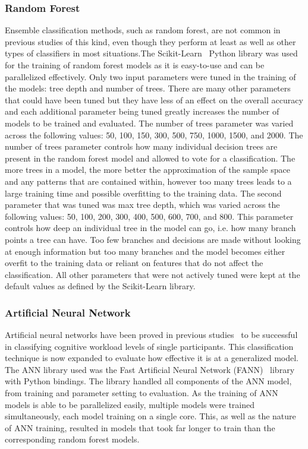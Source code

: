 \documentclass[11pt]{article}
\begin{document}
		\subsubsection{Random Forest}
		Ensemble classification methods, such as random forest, are not common in previous studies of this kind, even though they perform at least as well as other types of classifiers in most situations.The Scikit-Learn~\cite{} Python library was used for the training of random forest models as it is easy-to-use and can be parallelized effectively. Only two input parameters were tuned in the training of the models: tree depth and number of trees. There are many other parameters that could have been tuned but they have less of an effect on the overall accuracy and each additional parameter being tuned greatly increases the number of models to be trained and evaluated. The number of trees parameter was varied across the following values: 50, 100, 150, 300, 500, 750, 1000, 1500, and 2000. The number of trees parameter controls how many individual decision trees are present in the random forest model and allowed to vote for a classification. The more trees in a model, the more better the approximation of the sample space and any patterns that are contained within, however too many trees leads to a large training time and possible overfitting to the training data. The second parameter that was tuned was max tree depth, which was varied across the following values: 50, 100, 200, 300, 400, 500, 600, 700, and 800. This parameter controls how deep an individual tree in the model can go, i.e. how many branch points a tree can have. Too few branches and decisions are made without looking at enough information but too many branches and the model becomes either overfit to the training data or reliant on features that do not affect the classification. All other parameters that were not actively tuned were kept at the default values as defined by the Scikit-Learn library.
		
		\subsubsection{Artificial Neural Network}
		Artificial neural networks have been proved in previous studies~\cite{..} to be successful in classifying cognitive workload levels of single participants. This classification technique is now expanded to evaluate how effective it is at a generalized model. The ANN library used was the Fast Artificial Neural Network (FANN)~\cite{} library with Python bindings. The library handled all components of the ANN model, from training and parameter setting to evaluation. As the training of ANN models is able to be parallelized easily, multiple models were trained simultaneously, each model training on a single core. This, as well as the nature of ANN training, resulted in models that took far longer to train than the corresponding random forest models.
		
\end{document}
